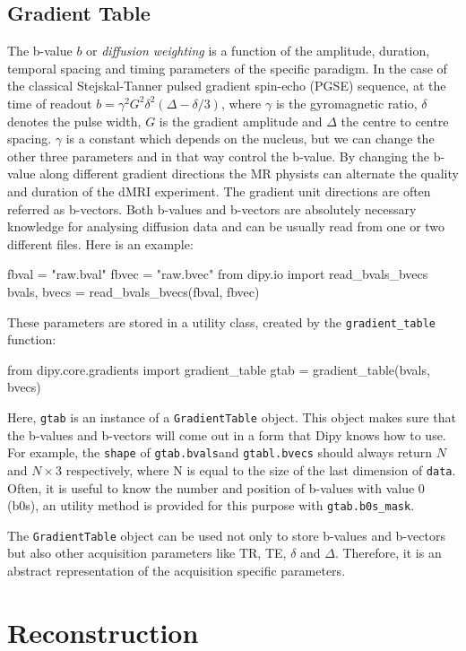 \documentclass{bioinfo}
\begin{document}
\subsection{Gradient Table}\label{gtab}
The b-value $b$ or \emph{diffusion weighting} is a function of the amplitude, duration, temporal spacing and timing parameters of the specific paradigm. In the case of the classical Stejskal-Tanner pulsed gradient spin-echo (PGSE) sequence, at the time of readout $b=\gamma^{2}G^{2}\delta^{2}\left(\Delta-\delta/3 \right)$,
where $\gamma$ is the gyromagnetic ratio, $\delta$ denotes the pulse width, $G$ is the gradient amplitude and $\Delta$ the centre to centre spacing. $\gamma$ is a constant which depends on the nucleus, but we can change the other three parameters and in that way control the b-value. By changing the b-value along different gradient directions the MR physists can alternate the quality and duration of the dMRI experiment. The gradient unit directions are often referred as b-vectors. Both b-values and b-vectors are absolutely necessary knowledge for analysing diffusion data and can be usually read from one or two different files. Here is an example:
\begin{python}
fbval = "raw.bval"
fbvec = "raw.bvec"
from dipy.io import read_bvals_bvecs
bvals, bvecs = read_bvals_bvecs(fbval, fbvec)
\end{python}
These parameters are stored in a utility class, created by the \texttt{gradient\_table} function:
\begin{python}
from dipy.core.gradients import gradient_table
gtab = gradient_table(bvals, bvecs)
\end{python}
Here, \texttt{gtab} is an instance of a \texttt{GradientTable} object. This object makes sure that the b-values and b-vectors will come out in a form that Dipy knows how to use. For example, the \texttt{shape} of \texttt{gtab.bvals}and \texttt{gtabl.bvecs} should always return $N$ and $N\times3$ respectively, where N is equal to the size of the last dimension of \texttt{data}. Often, it is useful to know the number and position of b-values with value 0 (b0s), an utility method is provided for this purpose with \texttt{gtab.b0s\_mask}.

The \texttt{GradientTable} object can be used not only to store b-values and b-vectors but also other acquisition parameters like TR, TE, $\delta$ and $\Delta$. Therefore, it is an abstract representation of the acquisition specific parameters.

\section{Reconstruction}
\end{document}
